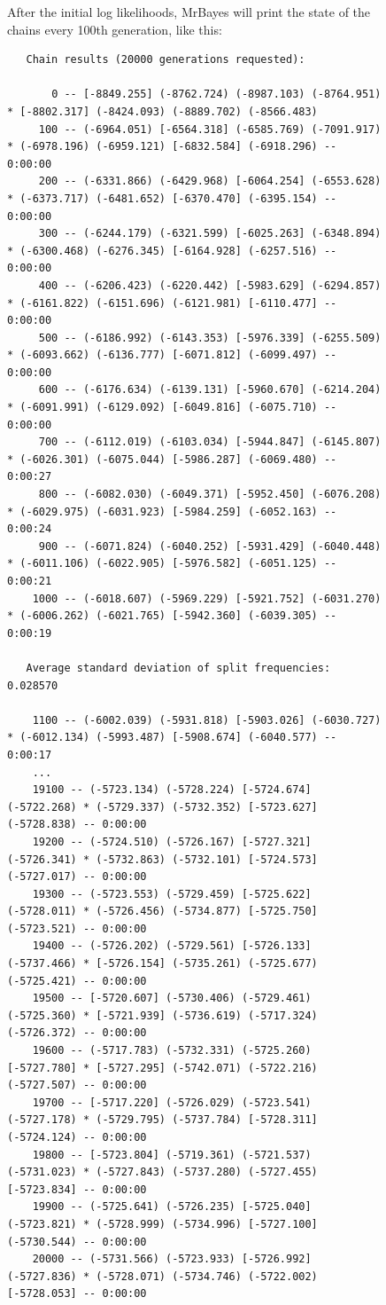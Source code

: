 \documentclass[12pt]{book}
\begin{document}
\begin{figure}[h]
After the initial log likelihoods, MrBayes will print the state of the chains every 100th
generation, like this:

\begin{singlespacing}
\tiny
\begin{verbatim}
   Chain results (20000 generations requested):

       0 -- [-8849.255] (-8762.724) (-8987.103) (-8764.951) * [-8802.317] (-8424.093) (-8889.702) (-8566.483) 
     100 -- (-6964.051) [-6564.318] (-6585.769) (-7091.917) * (-6978.196) (-6959.121) [-6832.584] (-6918.296) -- 0:00:00
     200 -- (-6331.866) (-6429.968) [-6064.254] (-6553.628) * (-6373.717) (-6481.652) [-6370.470] (-6395.154) -- 0:00:00
     300 -- (-6244.179) (-6321.599) [-6025.263] (-6348.894) * (-6300.468) (-6276.345) [-6164.928] (-6257.516) -- 0:00:00
     400 -- (-6206.423) (-6220.442) [-5983.629] (-6294.857) * (-6161.822) (-6151.696) (-6121.981) [-6110.477] -- 0:00:00
     500 -- (-6186.992) (-6143.353) [-5976.339] (-6255.509) * (-6093.662) (-6136.777) [-6071.812] (-6099.497) -- 0:00:00
     600 -- (-6176.634) (-6139.131) [-5960.670] (-6214.204) * (-6091.991) (-6129.092) [-6049.816] (-6075.710) -- 0:00:00
     700 -- (-6112.019) (-6103.034) [-5944.847] (-6145.807) * (-6026.301) (-6075.044) [-5986.287] (-6069.480) -- 0:00:27
     800 -- (-6082.030) (-6049.371) [-5952.450] (-6076.208) * (-6029.975) (-6031.923) [-5984.259] (-6052.163) -- 0:00:24
     900 -- (-6071.824) (-6040.252) [-5931.429] (-6040.448) * (-6011.106) (-6022.905) [-5976.582] (-6051.125) -- 0:00:21
    1000 -- (-6018.607) (-5969.229) [-5921.752] (-6031.270) * (-6006.262) (-6021.765) [-5942.360] (-6039.305) -- 0:00:19

   Average standard deviation of split frequencies: 0.028570

    1100 -- (-6002.039) (-5931.818) [-5903.026] (-6030.727) * (-6012.134) (-5993.487) [-5908.674] (-6040.577) -- 0:00:17
    ...
    19100 -- (-5723.134) (-5728.224) [-5724.674] (-5722.268) * (-5729.337) (-5732.352) [-5723.627] (-5728.838) -- 0:00:00
    19200 -- (-5724.510) (-5726.167) [-5727.321] (-5726.341) * (-5732.863) (-5732.101) [-5724.573] (-5727.017) -- 0:00:00
    19300 -- (-5723.553) (-5729.459) [-5725.622] (-5728.011) * (-5726.456) (-5734.877) [-5725.750] (-5723.521) -- 0:00:00
    19400 -- (-5726.202) (-5729.561) [-5726.133] (-5737.466) * [-5726.154] (-5735.261) (-5725.677) (-5725.421) -- 0:00:00
    19500 -- [-5720.607] (-5730.406) (-5729.461) (-5725.360) * [-5721.939] (-5736.619) (-5717.324) (-5726.372) -- 0:00:00
    19600 -- (-5717.783) (-5732.331) (-5725.260) [-5727.780] * [-5727.295] (-5742.071) (-5722.216) (-5727.507) -- 0:00:00
    19700 -- [-5717.220] (-5726.029) (-5723.541) (-5727.178) * (-5729.795) (-5737.784) [-5728.311] (-5724.124) -- 0:00:00
    19800 -- [-5723.804] (-5719.361) (-5721.537) (-5731.023) * (-5727.843) (-5737.280) (-5727.455) [-5723.834] -- 0:00:00
    19900 -- (-5725.641) (-5726.235) [-5725.040] (-5723.821) * (-5728.999) (-5734.996) [-5727.100] (-5730.544) -- 0:00:00
    20000 -- (-5731.566) (-5723.933) [-5726.992] (-5727.836) * (-5728.071) (-5734.746) (-5722.002) [-5728.053] -- 0:00:00
 

\end{verbatim}
\end{singlespacing}
\end{figure}
\end{document}
